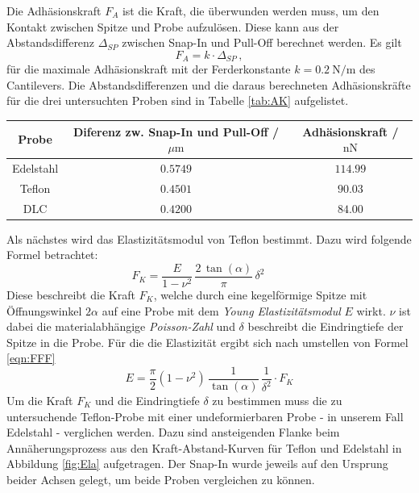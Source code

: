         Die Adhäsionskraft $F_A$ ist die Kraft, die überwunden werden muss, um den Kontakt zwischen Spitze und Probe aufzulösen. Diese kann aus der Abstandsdifferenz $\Delta_{SP}$ zwischen Snap-In und Pull-Off berechnet werden. Es gilt
        \begin{equation}
            F_A = k\cdot\Delta_{SP} \, ,
        \end{equation}
        für die maximale Adhäsionskraft mit der Ferderkonstante $k=\SI{0.2}{\newton\per\metre}$ des Cantilevers. Die Abstandsdifferenzen und die daraus berechneten Adhäsionskräfte für die drei untersuchten Proben sind in Tabelle \ref{tab:AK} aufgelistet.
        \begin{center}
            \label{tab:AK}
            \begin{tabular}{c c c}
                \toprule
                Probe & Diferenz zw. Snap-In und Pull-Off / $\mu\text{m}$ & Adhäsionskraft / $\text{nN}$ \\
                \midrule
                Edelstahl & $0.5749$ & $114.99$\\
                Teflon    & $0.4501$ & $90.03$ \\
                DLC       & $0.4200$ & $84.00$ \\
                \bottomrule
            \end{tabular}
        \end{center}
        Als nächstes wird das Elastizitätsmodul von Teflon bestimmt. Dazu wird folgende Formel \cite{Elastic} betrachtet:
        \begin{equation}
            F_K = \frac{E}{1-\nu^2}\,\frac{2\,\tan(\alpha)}{\pi}\,\delta^2 \qquad
            \label{eqn:FFF}
        \end{equation}
        Diese beschreibt die Kraft $F_K$, welche durch eine kegelförmige Spitze mit Öffnungswinkel $2\alpha$ auf eine Probe mit dem \textit{Young Elastizitätsmodul} $E$ wirkt. $\nu$ ist dabei die materialabhängige \textit{Poisson-Zahl} und $\delta$ beschreibt die Eindringtiefe der Spitze in die Probe. Für die die Elastizität ergibt sich nach umstellen von Formel \ref{eqn:FFF}
        \begin{equation}
            E = \frac{\pi}{2}\left(1-\nu^2\right)\,\frac{1}{\tan(\alpha)}\,\frac{1}{\delta^2}\cdot F_K
            \label{eqn:EEE}
        \end{equation}
        Um die Kraft $F_K$ und die Eindringtiefe $\delta$ zu bestimmen muss die zu untersuchende Teflon-Probe mit einer undeformierbaren Probe - in unserem Fall Edelstahl - verglichen werden. Dazu sind ansteigenden Flanke beim Annäherungsprozess aus den Kraft-Abstand-Kurven für Teflon und Edelstahl in Abbildung \ref{fig:Ela} aufgetragen. Der Snap-In wurde jeweils auf den Ursprung beider Achsen gelegt, um beide Proben vergleichen zu können.
